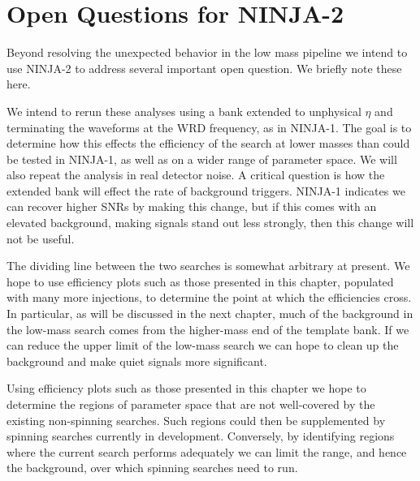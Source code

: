 \section{Open Questions for NINJA-2}

Beyond resolving the unexpected behavior in the low mass pipeline
we intend to use NINJA-2 to address several important open question.
We briefly note these here.


We intend to rerun these analyses using a bank extended to unphysical
$\eta$ and terminating the waveforms at the WRD frequency, as in
NINJA-1.  The goal is to determine how this effects the efficiency of
the search at lower masses than could be tested in NINJA-1, as well as
on a wider range of parameter space.  We will also repeat the analysis
in real detector noise.  A critical question is how the extended bank
will effect the rate of background triggers.  NINJA-1 indicates we can
recover higher SNRs by making this change, but if this comes with an
elevated background, making signals stand out less strongly, then this
change will not be useful.


The dividing line between the two searches is somewhat arbitrary at
present.  We hope to use efficiency plots such as those presented in
this chapter, populated with many more injections, to determine the
point at which the efficiencies cross.  In particular, as will be
discussed in the next chapter, much of the background in the low-mass
search comes from the higher-mass end of the template bank.  If we can
reduce the upper limit of the low-mass search we can hope to clean up
the background and make quiet signals more significant.


Using efficiency plots such as those presented in this chapter we hope
to determine the regions of parameter space that are not well-covered
by the existing non-spinning searches.  Such regions could then be
supplemented by spinning searches currently in development.
Conversely, by identifying regions where the current search performs
adequately we can limit the range, and hence the background, over
which spinning searches need to run.


